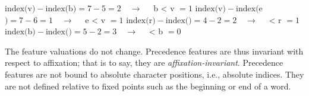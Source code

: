 \begin{exe}
    \ex \begin{xlist}
	\ex $\text{index}($\textsf{v}$) - \text{index}($\textsf{b}$) = 7 - 5 = 2 \quad\to\quad $ \textsf{b < v} $ =1 $
	\ex $\text{index}($\textsf{v}$) - \text{index}($\textsf{e}$) = 7 - 6 = 1 \quad\to\quad $ \textsf{e < v} $ =1 $
	\ex $\text{index}($\textsf{r}$) - \text{index}($\textsf{\textrevglotstop}$) = 4 - 2 = 2 \quad\to\quad $\textsf{ < r} $ =1 $
	\ex $\text{index}($\textsf{b}$) - \text{index}($\textsf{\textrevglotstop}$) = 5 - 2 = 3 \quad\to\quad $ \textsf{ < b} $ =0 $ 
    \end{xlist}
\end{exe}


The feature valuations do not change.
Precedence features are thus invariant with respect to affixation; that is to say, 
they are 
\emph{affixation-invariant}.
Precedence features are not bound to absolute character positions, i.e., 
absolute indices. They are not defined relative to fixed points such as 
the beginning or end of a word.

